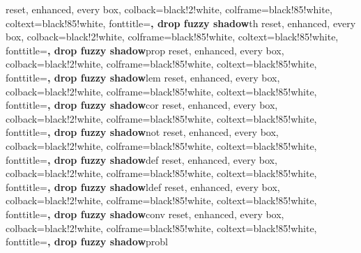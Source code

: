 %
{reset, enhanced, every box,
	colback=black!2!white, colframe=black!85!white, coltext=black!85!white,
	fonttitle=\small\bfseries, drop fuzzy shadow}{th}
%
{reset, enhanced, every box,
	colback=black!2!white, colframe=black!85!white, coltext=black!85!white,
	fonttitle=\small\bfseries, drop fuzzy shadow}{prop}
%
{reset, enhanced, every box,
	colback=black!2!white, colframe=black!85!white, coltext=black!85!white,
	fonttitle=\small\bfseries, drop fuzzy shadow}{lem}
%
{reset, enhanced, every box,
	colback=black!2!white, colframe=black!85!white, coltext=black!85!white,
	fonttitle=\small\bfseries, drop fuzzy shadow}{cor}
%
{reset, enhanced, every box,
	colback=black!2!white, colframe=black!85!white, coltext=black!85!white,
	fonttitle=\small\bfseries, drop fuzzy shadow}{not}
%
{reset, enhanced, every box,
	colback=black!2!white, colframe=black!85!white, coltext=black!85!white,
	fonttitle=\small\bfseries, drop fuzzy shadow}{def}
%
{reset, enhanced, every box,
	colback=black!2!white, colframe=black!85!white, coltext=black!85!white,
	fonttitle=\small\bfseries, drop fuzzy shadow}{ldef}
%
{reset, enhanced, every box,
	colback=black!2!white, colframe=black!85!white, coltext=black!85!white,
	fonttitle=\small\bfseries, drop fuzzy shadow}{conv}
%
{reset, enhanced, every box,
	colback=black!2!white, colframe=black!85!white, coltext=black!85!white,
	fonttitle=\small\bfseries, drop fuzzy shadow}{probl}
%
